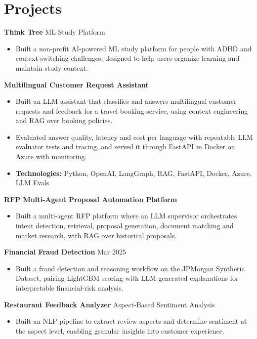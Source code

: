 \documentclass[10pt,a4paper]{article}
\begin{document}
\section{Projects}
\textbf{Think Tree} \textbar{} ML Study Platform\par
\begin{itemize}
  \item Built a non-profit AI-powered ML study platform for people with ADHD and context-switching challenges, designed to help users organize learning and maintain study context.
\end{itemize}
\textbf{Multilingual Customer Request Assistant}\par
\begin{itemize}
  \item Built an LLM assistant that classifies and answers multilingual customer requests and feedback for a travel booking service, using context engineering and RAG over booking policies.
  \item Evaluated answer quality, latency and cost per language with repeatable LLM evaluator tests and tracing, and served it through FastAPI in Docker on Azure with monitoring.
  \item \textbf{Technologies:} Python, OpenAI, LangGraph, RAG, FastAPI, Docker, Azure, LLM Evals
\end{itemize}
\textbf{RFP Multi-Agent Proposal Automation Platform}\par
\begin{itemize}
  \item Built a multi-agent RFP platform where an LLM supervisor orchestrates intent detection, retrieval, proposal generation, document matching and market research, with RAG over historical proposals.
\end{itemize}
\textbf{Financial Fraud Detection} \textbar{} Mar 2025\par
\begin{itemize}
  \item Built a fraud detection and reasoning workflow on the JPMorgan Synthetic Dataset, pairing LightGBM scoring with LLM-generated explanations for interpretable financial-risk analysis.
\end{itemize}
\textbf{Restaurant Feedback Analyzer} \textbar{} Aspect-Based Sentiment Analysis\par
\begin{itemize}
  \item Built an NLP pipeline to extract review aspects and determine sentiment at the aspect level, enabling granular insights into customer experience.
\end{itemize}
\end{document}
